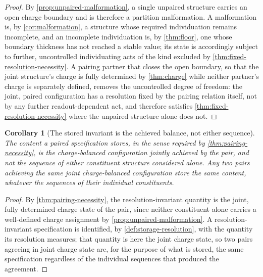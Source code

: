 \documentclass[11pt,twocolumn,a4paper]{article}
\theoremstyle{plain}
\newtheorem{corollary}[theorem]{Corollary}
\theoremstyle{definition}
\theoremstyle{remark}
\begin{document}
\begin{proof}
By \cref{prop:unpaired-malformation}, a single unpaired structure carries
an open charge boundary and is therefore a partition malformation. A
malformation is, by \cref{cor:malformation}, a structure whose required
individuation remains incomplete, and an incomplete individuation is, by
\cref{thm:floor}, one whose boundary thickness has not reached a stable
value; its state is accordingly subject to further, uncontrolled
individuating acts of the kind excluded by
\cref{thm:fixed-resolution-necessity}. A pairing partner that closes the
open boundary, so that the joint structure's charge is fully determined by
\cref{thm:charge} while neither partner's charge is separately defined,
removes the uncontrolled degree of freedom: the joint, paired
configuration has a resolution fixed by the pairing relation itself, not
by any further readout-dependent act, and therefore satisfies
\cref{thm:fixed-resolution-necessity} where the unpaired structure alone
does not.
\end{proof}

\begin{corollary}[The stored invariant is the achieved balance, not
either sequence]
\label{cor:invariant-is-balance}
The content a paired specification stores, in the sense required by
\cref{thm:pairing-necessity}, is the charge-balanced configuration jointly
achieved by the pair, and not the sequence of either constituent
structure considered alone. Any two pairs achieving the same joint
charge-balanced configuration store the same content, whatever the
sequences of their individual constituents.
\end{corollary}

\begin{proof}
By \cref{thm:pairing-necessity}, the resolution-invariant quantity is the
joint, fully determined charge state of the pair, since neither
constituent alone carries a well-defined charge assignment by
\cref{prop:unpaired-malformation}. A resolution-invariant specification is
identified, by \cref{def:storage-resolution}, with the quantity its
resolution measures; that quantity is here the joint charge state, so two
pairs agreeing in joint charge state are, for the purpose of what is
stored, the same specification regardless of the individual sequences
that produced the agreement.
\end{proof}
\end{document}
